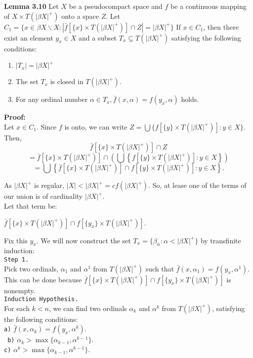 \documentclass{article}
\begin{document}
\textbf{Lemma 3.10} Let $X$ be a pseudocompact space and $f$ be a continuous mapping of $X\times T(|\beta X|^+) $
onto a space $Z$. Let $C_1=\{x\in  \beta X \backslash X: |\bar{f}[\{x\} \times T(|\beta X|^+)] \cap Z|=|\beta X|^+\}$
If $x\in C_1$, then there exist an element $y_x \in X$ and a subset $T_x \subseteq T(|\beta X|^+)$ satisfying the following conditions: 
\begin{enumerate}
	\item $|T_x|=|\beta X|^+$
	\item The set $T_x$ is closed in $T(|\beta X|^+).$
	\item For any ordinal number $\alpha \in T_x, \bar{f} (x,\alpha)=f(y_x,\alpha)$ holds.
\end{enumerate}

\vskip 20pt

\textbf{Proof:} \\
Let $x\in C_1$. Since $f$ is onto, we can write $Z=\bigcup \{f[\{y\}\times T(|\beta X|^+)]: y\in X\}$. Then,  $$\bar{f}[\{x\}\times T(|\beta X|^+)] \cap Z$$
$$=\bar{f}\left[\{x\}\times T(|\beta X|^+)\right] \cap \left(\bigcup \left\{f[\{y\}\times T(|\beta X|^+)]: y\in X\right\}\right)$$
$$=\bigcup \left\{\bar{f}\left[\{x\}\times T(|\beta X|^+)\right] \cap f\left[\{y\}\times T(|\beta X|^+)\right]: y\in X \right\}.$$

\vskip 5pt

As $|\beta X|^+$ is regular, $|X|<|\beta X|^+=cf(|\beta X|^+).$ So, at lease one of the terms of our union is of cardinality $|\beta X|^+$. \\
Let that term be:
\begin{center}
 $ \bar{f}\left[\{x\}\times T(|\beta X|^+)\right] \cap f\left[\{y_x\} \times T(|\beta X |^+)\right]$.
\end{center}
Fix this $y_x$. We will now construct the set $T_x=\{\beta_\alpha: \alpha < |\beta X|^+\}$ by transfinite induction:\\

\texttt{Step 1.}\\ Pick two ordinals, $\alpha_1$ and $ \alpha^1$ from $T(|\beta X|^+)$ such that $\bar{f}(x,\alpha_1)=f(y_x, \alpha^1)$. This can be done because $\bar{f}[\{x\}\times T(|\beta X|^+)] \cap f[\{y_x\} \times T(|\beta X |^+)]$ is nonempty.\\

\texttt{Induction Hypothesis.}\\ For each $k<n$, we can find two ordinals $\alpha_k$ and $\alpha^k$ from $T(|\beta X|^+)$,  satisfying the following conditions: \\
	\texttt{a)} $\bar{f}(x,\alpha_k)=f(y_x,\alpha^k)$.	\\	
\texttt{	b)} $\alpha_k> \max\{\alpha_{k-1}, \alpha^{k-1}\}$.\\	
	\texttt{c)} $\alpha^k> \max\{\alpha_{k-1}, \alpha^{k-1}\}$.\\
\end{document}
